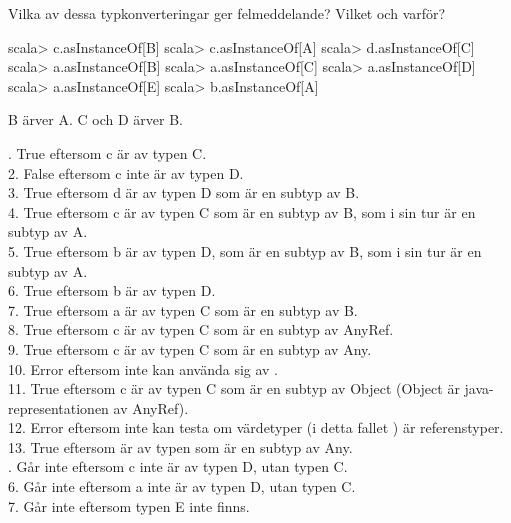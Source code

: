 \Subtask Vilka av dessa typkonverteringar ger felmeddelande? Vilket och varför?
\begin{REPL}
scala> c.asInstanceOf[B]
scala> c.asInstanceOf[A]
scala> d.asInstanceOf[C]
scala> a.asInstanceOf[B]
scala> a.asInstanceOf[C]
scala> a.asInstanceOf[D]
scala> a.asInstanceOf[E]
scala> b.asInstanceOf[A]
\end{REPL}



\SOLUTION


\TaskSolved \what


\SubtaskSolved  B ärver A. C och D ärver B.

. True eftersom c är av typen C. \\
2. False eftersom c inte är av typen D. \\
3. True eftersom d är av typen D som är en subtyp av B. \\
4. True eftersom c är av typen C som är en subtyp av B, som i sin tur är en subtyp av A. \\
5. True eftersom b är av typen D, som är en subtyp av B, som i sin tur är en subtyp av A. \\
6. True eftersom b är av typen D. \\
7. True eftersom a är av typen C som är en subtyp av B. \\
8. True eftersom c är av typen C som är en subtyp av AnyRef. \\
9. True eftersom c är av typen C som är en subtyp av Any. \\
10. Error eftersom  inte kan använda sig av .  \\
11. True eftersom c är av typen C som är en subtyp av Object (Object är java-representationen av AnyRef). \\
12. Error eftersom  inte kan testa om värdetyper (i detta fallet ) är referenstyper. \\
13. True eftersom  är av typen  som är en subtyp av Any. \\

. Går inte eftersom c inte är av typen D, utan typen C. \\
6. Går inte eftersom a inte är av typen D, utan typen C. \\
7. Går inte eftersom typen E inte finns. \\


\QUESTEND













